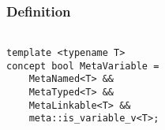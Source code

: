 
\subsubsection{Definition}

\begin{verbatim}

template <typename T>
concept bool MetaVariable =
	MetaNamed<T> &&
	MetaTyped<T> &&
	MetaLinkable<T> &&
	meta::is_variable_v<T>;

\end{verbatim}
